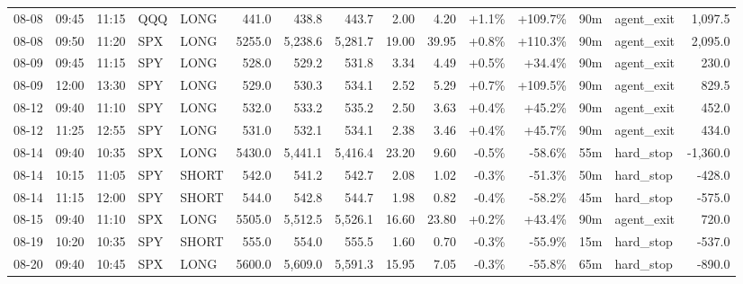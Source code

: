 \documentclass[11pt,a4paper,twoside]{article}
\begin{document}
\begin{landscape}
\begin{center}
\begin{longtable}{>{\color{txtmain}}l l l l l r r r r r r r r >{\color{txtmain}}l r}
08-08 & 09:45 & 11:15 & QQQ & LONG & 441.0 & 438.8 & 443.7 & 2.00 & 4.20 & \textcolor{wingreen}{+1.1\%} & \textcolor{wingreen}{+109.7\%} & 90m & agent\_exit & \textcolor{wingreen}{1,097.5} \\
08-08 & 09:50 & 11:20 & SPX & LONG & 5255.0 & 5,238.6 & 5,281.7 & 19.00 & 39.95 & \textcolor{wingreen}{+0.8\%} & \textcolor{wingreen}{+110.3\%} & 90m & agent\_exit & \textcolor{wingreen}{2,095.0} \\
08-09 & 09:45 & 11:15 & SPY & LONG & 528.0 & 529.2 & 531.8 & 3.34 & 4.49 & \textcolor{wingreen}{+0.5\%} & \textcolor{wingreen}{+34.4\%} & 90m & agent\_exit & \textcolor{wingreen}{230.0} \\
08-09 & 12:00 & 13:30 & SPY & LONG & 529.0 & 530.3 & 534.1 & 2.52 & 5.29 & \textcolor{wingreen}{+0.7\%} & \textcolor{wingreen}{+109.5\%} & 90m & agent\_exit & \textcolor{wingreen}{829.5} \\
08-12 & 09:40 & 11:10 & SPY & LONG & 532.0 & 533.2 & 535.2 & 2.50 & 3.63 & \textcolor{wingreen}{+0.4\%} & \textcolor{wingreen}{+45.2\%} & 90m & agent\_exit & \textcolor{wingreen}{452.0} \\
08-12 & 11:25 & 12:55 & SPY & LONG & 531.0 & 532.1 & 534.1 & 2.38 & 3.46 & \textcolor{wingreen}{+0.4\%} & \textcolor{wingreen}{+45.7\%} & 90m & agent\_exit & \textcolor{wingreen}{434.0} \\
08-14 & 09:40 & 10:35 & SPX & LONG & 5430.0 & 5,441.1 & 5,416.4 & 23.20 & 9.60 & \textcolor{lossred}{-0.5\%} & \textcolor{lossred}{-58.6\%} & 55m & hard\_stop & \textcolor{lossred}{-1,360.0} \\
08-14 & 10:15 & 11:05 & SPY & SHORT & 542.0 & 541.2 & 542.7 & 2.08 & 1.02 & \textcolor{lossred}{-0.3\%} & \textcolor{lossred}{-51.3\%} & 50m & hard\_stop & \textcolor{lossred}{-428.0} \\
08-14 & 11:15 & 12:00 & SPY & SHORT & 544.0 & 542.8 & 544.7 & 1.98 & 0.82 & \textcolor{lossred}{-0.4\%} & \textcolor{lossred}{-58.2\%} & 45m & hard\_stop & \textcolor{lossred}{-575.0} \\
08-15 & 09:40 & 11:10 & SPX & LONG & 5505.0 & 5,512.5 & 5,526.1 & 16.60 & 23.80 & \textcolor{wingreen}{+0.2\%} & \textcolor{wingreen}{+43.4\%} & 90m & agent\_exit & \textcolor{wingreen}{720.0} \\
08-19 & 10:20 & 10:35 & SPY & SHORT & 555.0 & 554.0 & 555.5 & 1.60 & 0.70 & \textcolor{lossred}{-0.3\%} & \textcolor{lossred}{-55.9\%} & 15m & hard\_stop & \textcolor{lossred}{-537.0} \\
08-20 & 09:40 & 10:45 & SPX & LONG & 5600.0 & 5,609.0 & 5,591.3 & 15.95 & 7.05 & \textcolor{lossred}{-0.3\%} & \textcolor{lossred}{-55.8\%} & 65m & hard\_stop & \textcolor{lossred}{-890.0} \\

\end{longtable}
\end{center}
\end{landscape}
\end{document}
